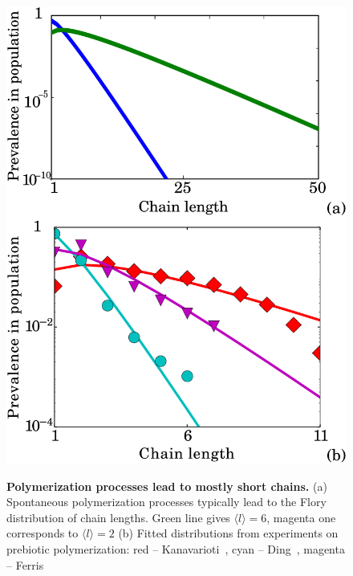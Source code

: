 \documentclass[5p,times]{elsarticle}
\begin{document}
\begin{figure}[h!]
  \centering
  \includegraphics[width=0.9\columnwidth]{pictures/flory-two.pdf} \\
  \caption{\textbf{Polymerization processes lead to mostly short chains.} (a)  Spontaneous 
polymerization processes typically lead to the Flory distribution of chain lengths. 
Green line gives $\langle  l \rangle= 6$, magenta one corresponds to $\langle l \rangle=2$
(b) Fitted distributions from experiments on prebiotic polymerization: red -- 
Kanavarioti~\cite{Kanavarioti2001}, cyan -- Ding~\cite{Ding1996}, 
magenta -- Ferris~\cite{Ferris1999}}
  \label{fig:flory}
\end{figure}
\end{document}
